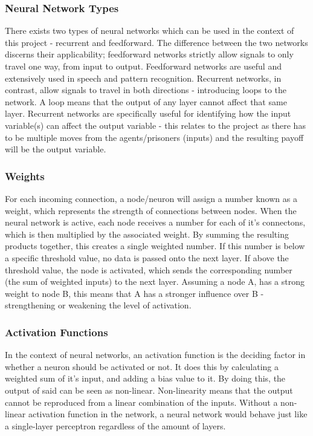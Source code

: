\documentclass[12pt,a4paper]{article}
\begin{document}
\subsubsection{Neural Network Types}
There exists two types of neural networks which can be used in the context of this project - recurrent and feedforward. The difference between the two networks discerns their applicability; feedforward networks strictly allow signals to only travel one way, from input to output. Feedforward networks are useful and extensively used in speech and pattern recognition. Recurrent networks, in contrast, allow signals to travel in both directions - introducing loops to the network. A loop means that the output of any layer cannot affect that same layer. Recurrent networks are specifically useful for identifying how the input variable(s) can affect the output variable - this relates to the project as there has to be multiple moves from the agents/prisoners (inputs) and the resulting payoff will be the output variable.

\subsubsection{Weights}
For each incoming connection, a node/neuron will assign a number known as a weight, which represents the strength of connections between nodes. When the neural network is active, each node receives a number for each of it's connectons, which is then multiplied by the associated weight. By summing the resulting products together, this creates a single weighted number. If this number is below a specific threshold value, no data is passed onto the next layer. If above the threshold value, the node is activated, which sends the corresponding number (the sum of weighted inputs) to the next layer. Assuming a node A, has a strong weight to node B, this means that A has a stronger influence over B - strengthening or weakening the level of activation.

\subsubsection{Activation Functions}
In the context of neural networks, an activation function is the deciding factor in whether a neuron should be activated or not. It does this by calculating a weighted sum of it's input, and adding a bias value to it. By doing this, the output of said can be seen as non-linear. Non-linearity means that the output cannot be reproduced from a linear combination of the inputs. Without a non-linear activation function in the network, a neural network would behave just like a single-layer perceptron regardless of the amount of layers.
\end{document}
